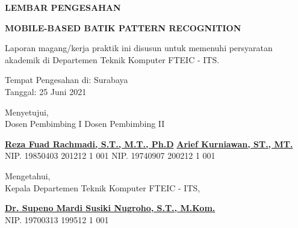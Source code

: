 \begin{center}
  {\Large \textbf{LEMBAR PENGESAHAN}}
  \vspace{6ex}


  {\large \textbf{MOBILE-BASED BATIK PATTERN RECOGNITION}}
  \vspace{6ex}

  Laporan magang/kerja praktik ini disusun untuk memenuhi persyaratan akademik di Departemen Teknik Komputer FTEIC - ITS.
  \vspace{2ex}

  Tempat Pengesahan di: Surabaya \\
  Tanggal: 25 Juni 2021
  \vspace{8ex}

  Menyetujui, \\
  Dosen Pembimbing I \hfill Dosen Pembimbing II
  \vspace{12ex}

  \textbf{\scriptsize \underline{Reza Fuad Rachmadi, S.T., M.T., Ph.D}}
  \hfill
  \textbf{\scriptsize \underline{Arief Kurniawan, ST., MT.}} \\
  {\small NIP. 19850403 201212 1 001}
  \hfill
  {\small NIP. 19740907 200212 1 001}
  \vspace{8ex}

  Mengetahui, \\
  Kepala Departemen Teknik Komputer FTEIC - ITS,
  \vspace{12ex}

  \textbf{\underline{Dr. Supeno Mardi Susiki Nugroho, S.T., M.Kom.}} \\
  NIP. 19700313 199512 1 001

\end{center}